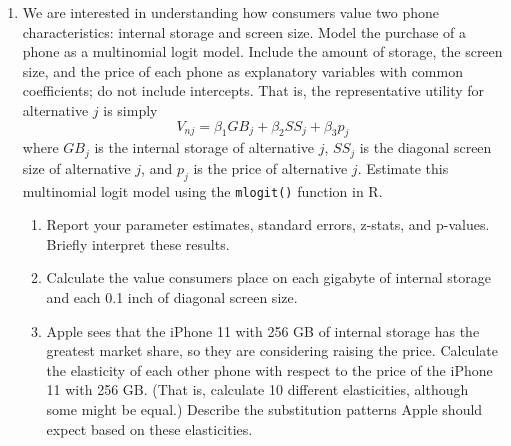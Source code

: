 \documentclass[11pt,letterpaper]{article}
\begin{document}
\begin{enumerate}[label=\alph*., leftmargin=*]
	\item We are interested in understanding how consumers value two phone characteristics: internal storage and screen size. Model the purchase of a phone as a multinomial logit model. Include the amount of storage, the screen size, and the price of each phone as explanatory variables with common coefficients; do not include intercepts. That is, the representative utility for alternative $j$ is simply
	$$V_{nj} = \beta_1 GB_j + \beta_2 SS_j + \beta_3 p_j$$
	where $GB_j$ is the internal storage of alternative $j$, $SS_j$ is the diagonal screen size of alternative $j$, and $p_j$ is the price of alternative $j$. Estimate this multinomial logit model using the \texttt{mlogit()} function in R. 
	\begin{enumerate}[label=\roman*.]
		\item Report your parameter estimates, standard errors, z-stats, and p-values. Briefly interpret these results. 
		\item Calculate the value consumers place on each gigabyte of internal storage and each 0.1 inch of diagonal screen size.
		\item Apple sees that the iPhone 11 with 256 GB of internal storage has the greatest market share, so they are considering raising the price. Calculate the elasticity of each other phone with respect to the price of the iPhone 11 with 256 GB. (That is, calculate 10 different elasticities, although some might be equal.) Describe the substitution patterns Apple should expect based on these elasticities.
	\end{enumerate}


\end{enumerate}
\end{document}
